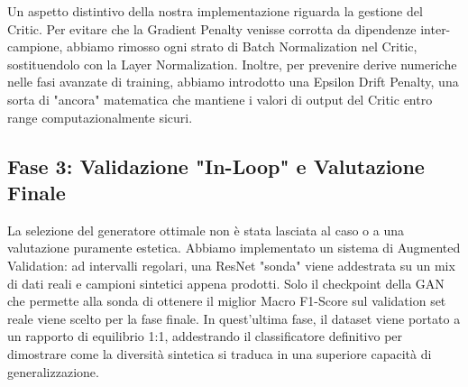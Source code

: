 Un aspetto distintivo della nostra implementazione riguarda la gestione del Critic. Per evitare che la Gradient Penalty venisse corrotta da dipendenze inter-campione, abbiamo rimosso ogni strato di Batch Normalization nel Critic, sostituendolo con la Layer Normalization. Inoltre, per prevenire derive numeriche nelle fasi avanzate di training, abbiamo introdotto una Epsilon Drift Penalty, una sorta di "ancora" matematica che mantiene i valori di output del Critic entro range computazionalmente sicuri.

\subsection{Fase 3: Validazione "In-Loop" e Valutazione Finale}

La selezione del generatore ottimale non è stata lasciata al caso o a una valutazione puramente estetica. Abbiamo implementato un sistema di Augmented Validation: ad intervalli regolari, una ResNet "sonda" viene addestrata su un mix di dati reali e campioni sintetici appena prodotti. Solo il checkpoint della GAN che permette alla sonda di ottenere il miglior Macro F1-Score sul validation set reale viene scelto per la fase finale. In quest'ultima fase, il dataset viene portato a un rapporto di equilibrio 1:1, addestrando il classificatore definitivo per dimostrare come la diversità sintetica si traduca in una superiore capacità di generalizzazione.